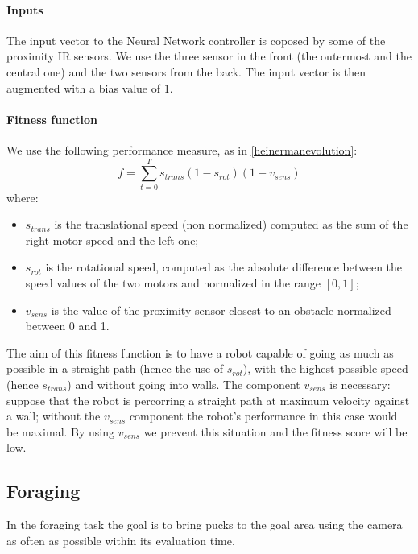 \documentclass{article}
\begin{document}
	\paragraph{Inputs} %
	\label{par:obstacle_inputs}
	The input vector to the Neural Network controller is coposed by some of the
	proximity IR sensors. We use the three sensor in the front (the outermost 
	and the central one) and the two sensors from the back. The input vector 
	is then augmented with a bias value of $1$.
	
	\paragraph{Fitness function} %
	\label{par:obstacle_fitness}
	We use the following performance measure, as in \ref{heinermanevolution}:
	$$f = \sum_{t=0}^{T}{s_{trans} (1 - s_{rot}) (1 - v_{sens})}$$
	where:
	\begin{itemize}
		\item $s_{trans}$ is the translational speed (non normalized)
			computed as the sum of the right motor speed and the left one;
		\item $s_{rot}$ is the rotational speed, computed as the absolute
			difference between the speed values of the two motors and normalized
			in the range $[0, 1]$;
		\item $v_{sens}$ is the value of the proximity sensor closest to an
			obstacle normalized between 0 and 1.
	\end{itemize}
	The aim of this fitness function is to have a robot capable of going as much
	as possible in a straight path (hence the use of $s_{rot}$), with the
	highest possible speed (hence $s_{trans}$) and without going into walls. The
	component $v_{sens}$ is necessary: suppose that the robot is percorring a
	straight path at maximum velocity against a wall; without the $v_{sens}$ component the
	robot's performance in this case would be maximal. By using $v_{sens}$ we
	prevent this situation and the fitness score will be low.

	\subsection{Foraging} %
	\label{sub:Foraging}
	In the foraging task the goal is to bring pucks to the goal area using the
	camera as often as possible within its evaluation time.
\end{document}
